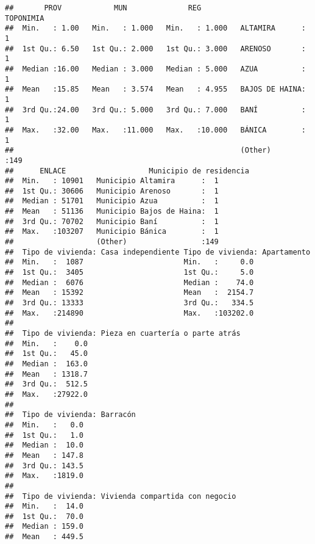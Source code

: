 \documentclass[11pt,]{article}
\begin{document}
\begin{verbatim}
##       PROV            MUN              REG                  TOPONIMIA  
##  Min.   : 1.00   Min.   : 1.000   Min.   : 1.000   ALTAMIRA      :  1  
##  1st Qu.: 6.50   1st Qu.: 2.000   1st Qu.: 3.000   ARENOSO       :  1  
##  Median :16.00   Median : 3.000   Median : 5.000   AZUA          :  1  
##  Mean   :15.85   Mean   : 3.574   Mean   : 4.955   BAJOS DE HAINA:  1  
##  3rd Qu.:24.00   3rd Qu.: 5.000   3rd Qu.: 7.000   BANÍ          :  1  
##  Max.   :32.00   Max.   :11.000   Max.   :10.000   BÁNICA        :  1  
##                                                    (Other)       :149  
##      ENLACE                   Municipio de residencia
##  Min.   : 10901   Municipio Altamira      :  1       
##  1st Qu.: 30606   Municipio Arenoso       :  1       
##  Median : 51701   Municipio Azua          :  1       
##  Mean   : 51136   Municipio Bajos de Haina:  1       
##  3rd Qu.: 70702   Municipio Baní          :  1       
##  Max.   :103207   Municipio Bánica        :  1       
##                   (Other)                 :149       
##  Tipo de vivienda: Casa independiente Tipo de vivienda: Apartamento
##  Min.   :  1087                       Min.   :     0.0             
##  1st Qu.:  3405                       1st Qu.:     5.0             
##  Median :  6076                       Median :    74.0             
##  Mean   : 15392                       Mean   :  2154.7             
##  3rd Qu.: 13333                       3rd Qu.:   334.5             
##  Max.   :214890                       Max.   :103202.0             
##                                                                    
##  Tipo de vivienda: Pieza en cuartería o parte atrás
##  Min.   :    0.0                                   
##  1st Qu.:   45.0                                   
##  Median :  163.0                                   
##  Mean   : 1318.7                                   
##  3rd Qu.:  512.5                                   
##  Max.   :27922.0                                   
##                                                    
##  Tipo de vivienda: Barracón
##  Min.   :   0.0            
##  1st Qu.:   1.0            
##  Median :  10.0            
##  Mean   : 147.8            
##  3rd Qu.: 143.5            
##  Max.   :1819.0            
##                            
##  Tipo de vivienda: Vivienda compartida con negocio
##  Min.   :  14.0                                   
##  1st Qu.:  70.0                                   
##  Median : 159.0                                   
##  Mean   : 449.5                                   

\end{verbatim}
\end{document}
